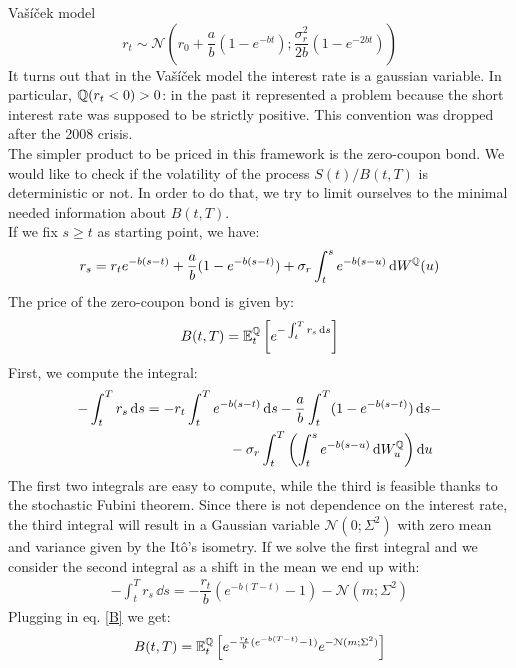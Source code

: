 \begin{example}{Vašíček model}{}{}
    \begin{equation}
        r_t \sim \mathcal{N}\left(r_0 + \frac{a}{b}(1-e^{-bt});\frac{\sigma^2_r}{2b}\left(1-e^{-2bt}\right)\right)
    \end{equation}
    It turns out that in the Vašíček model the interest rate is a gaussian variable. In particular, $\mathbb{Q}(r_t<0)>0$: in the past it represented a problem because the short interest rate was supposed to be strictly positive. This convention was dropped after the 2008 crisis.\\
    The simpler product to be priced in this framework is the zero-coupon bond. We would like to check if the volatility of the process $S(t)/B(t,T)$ is deterministic or not. In order to do that, we try to limit ourselves to the minimal needed information about $B(t,T)$. \\
    If we fix $s\ge t$ as starting point, we have:
    \begin{equation}
        r_s = r_te^{-b(s-t)} + \frac{a}{b}(1-e^{-b(s-t)}) + \sigma_r \int_t^s e^{-b(s-u)}\,\dd W^{\mathbb{Q}}(u)
    \end{equation}
    The price of the zero-coupon bond is given by:
    \begin{align}\label{B}
        B(t,T) = \mathbb{E}^{\mathbb{Q}}_t\left[e^{-\int_t^Tr_s\,\dd s}\right]
    \end{align}
    First, we compute the integral:
    \begin{align}
        \notag -\int_t^Tr_s\,\dd s &= -r_t\int_t^T e^{-b(s-t)}\,\dd s - \frac{a}{b}\int_t^T(1-e^{-b(s-t)})\,\dd s - \\
        &\qquad\qquad\qquad 
        - \sigma_r\int_t^T \left(\int_t^s e^{-b(s-u)}\,\dd W^{\mathbb{Q}}_u\right)\dd u
    \end{align}
    The first two integrals are easy to compute, while the third is feasible thanks to the stochastic Fubini theorem. Since there is not dependence on the interest rate, the third integral will result in a Gaussian variable $\mathcal{N}(0;\Sigma^2)$ with zero mean and variance given by the Itô's isometry. If we solve the first integral and we consider the second integral as a shift in the mean we end up with:
    \begin{align}
        -\int_t^Tr_s\,\dd s = -\dfrac{r_t}{b}(e^{-b(T-t)}-1) - \mathcal{N}(m;\Sigma^2)
    \end{align}
    Plugging in eq. \eqref{B} we get:
    \begin{equation}
        B(t,T) = \expect_t\left[e^{-\frac{r_t}{b}(e^{-b(T-t)}-1)}e^{-\mathcal{N}(m;\Sigma^2)}\right]

\end{equation}
\end{example}
